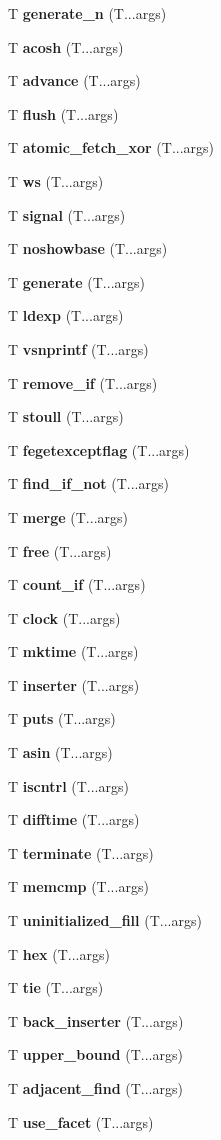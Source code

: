 \begin{DoxyCompactItemize}
T {\bf generate\+\_\+n} (T...\+args)
\item 
T {\bf acosh} (T...\+args)
\item 
T {\bf advance} (T...\+args)
\item 
T {\bf flush} (T...\+args)
\item 
T {\bf atomic\+\_\+fetch\+\_\+xor} (T...\+args)
\item 
T {\bf ws} (T...\+args)
\item 
T {\bf signal} (T...\+args)
\item 
T {\bf noshowbase} (T...\+args)
\item 
T {\bf generate} (T...\+args)
\item 
T {\bf ldexp} (T...\+args)
\item 
T {\bf vsnprintf} (T...\+args)
\item 
T {\bf remove\+\_\+if} (T...\+args)
\item 
T {\bf stoull} (T...\+args)
\item 
T {\bf fegetexceptflag} (T...\+args)
\item 
T {\bf find\+\_\+if\+\_\+not} (T...\+args)
\item 
T {\bf merge} (T...\+args)
\item 
T {\bf free} (T...\+args)
\item 
T {\bf count\+\_\+if} (T...\+args)
\item 
T {\bf clock} (T...\+args)
\item 
T {\bf mktime} (T...\+args)
\item 
T {\bf inserter} (T...\+args)
\item 
T {\bf puts} (T...\+args)
\item 
T {\bf asin} (T...\+args)
\item 
T {\bf iscntrl} (T...\+args)
\item 
T {\bf difftime} (T...\+args)
\item 
T {\bf terminate} (T...\+args)
\item 
T {\bf memcmp} (T...\+args)
\item 
T {\bf uninitialized\+\_\+fill} (T...\+args)
\item 
T {\bf hex} (T...\+args)
\item 
T {\bf tie} (T...\+args)
\item 
T {\bf back\+\_\+inserter} (T...\+args)
\item 
T {\bf upper\+\_\+bound} (T...\+args)
\item 
T {\bf adjacent\+\_\+find} (T...\+args)
\item 
T {\bf use\+\_\+facet} (T...\+args)

\end{DoxyCompactItemize}
